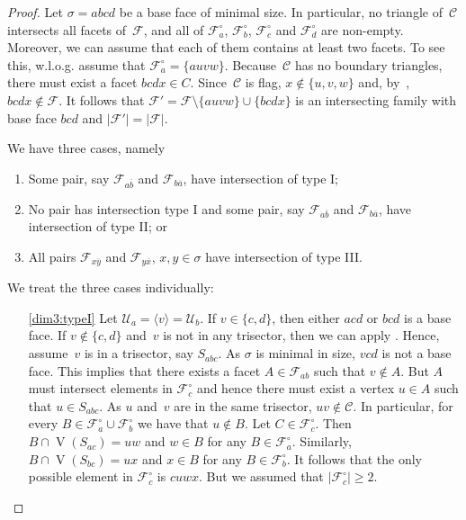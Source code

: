 \documentclass[a4paper,12pt]{amsart}
\theoremstyle{plain}
\theoremstyle{definition}
\newcommand{\U}{\mathcal U}
\newcommand{\C}{\mathcal C}
\newcommand{\family}{\mathcal F}
\newcommand{\facetA}{A}
\newcommand{\facetB}{B}
\newcommand{\facetC}{C}
\newcommand{\face}{\sigma}
\DeclareMathOperator{\vertices}{V}
\begin{document}
\begin{proof}
  Let $\face= abcd$ be a base face of minimal size.
  In particular, no triangle of~$\C$ intersects all facets of~$\family$, and all of $\family_a^\circ$, $\family_b^\circ$, $\family_c^\circ$ and $\family_d^\circ$ are non-empty.
  Moreover, we can assume that each of them contains at least two facets.
  To see this, w.l.o.g. assume that $\family_a^{\circ} = \{ auvw \}$.
  Because~$\C$ has no boundary triangles, there must exist a facet $bcdx \in C$.
  Since~$\C$ is flag, $x \not \in \{u,v,w \}$ and, by~, $bcdx \not \in \family$.
  It follows that $\family' = \family \setminus \{ auvw \} \cup \{ bcdx \}$ is an intersecting family with base face $bcd$ and $|\family'| = | \family |$.

We have three cases, namely
\begin{enumerate}
  \item \label{dim3:typeI} Some pair, say $\family_{a\overline b}$ and $\family_{b \overline a}$,  have intersection of type I;

  \item \label{dim3:typeII} No pair has intersection type I and some pair, say $\family_{a\overline b}$ and $\family_{b \overline a}$, have intersection of type II; or

  \item \label{dim3:typeIII} All pairs $\family_{x\overline y}$ and $\family_{y \overline x}$, $x,y \in \face$ have intersection of type III.
\end{enumerate}

We treat the three cases individually:
\begin{enumerate}
  \item[\eqref{dim3:typeI}]  Let $\U_a = \langle v \rangle = \U_b$. If $v \in \{ c,d\}$, then either $acd$ or $bcd$ is a base face. If $v \not \in \{ c,d\}$ and~$v$ is not in any trisector, then we can apply . Hence, assume~$v$ is in a trisector, say $S_{abc}$. As $\face$ is minimal in size, $vcd$ is not a base face. This implies that there exists a facet $\facetA \in \family_{ab}$ such that $v\notin \facetA$. But $\facetA$ must intersect elements in $\family_c^\circ$ and hence there must exist a vertex $u\in \facetA$ such that $u \in S_{abc}$. As $u$ and~$v$ are in the same trisector, $uv \notin \C$. In particular, for every $\facetB \in \family_a^\circ \cup \family_b^\circ$ we have that $u\notin \facetB$. Let $\facetC \in \family_c^\circ$. Then $\facetB\cap \vertices(S_{ac}) = uw$ and $w\in \facetB$ for any $\facetB \in \family_a^\circ$. Similarly, $\facetB\cap \vertices(S_{bc}) = ux$ and $x\in \facetB$ for any $\facetB \in \family_b^\circ$. It follows that the only possible element in $\family_c^\circ$ is $cuwx$. But we assumed that $| \family_c^\circ | \geq 2$.


\end{enumerate}
\end{proof}
\end{document}

